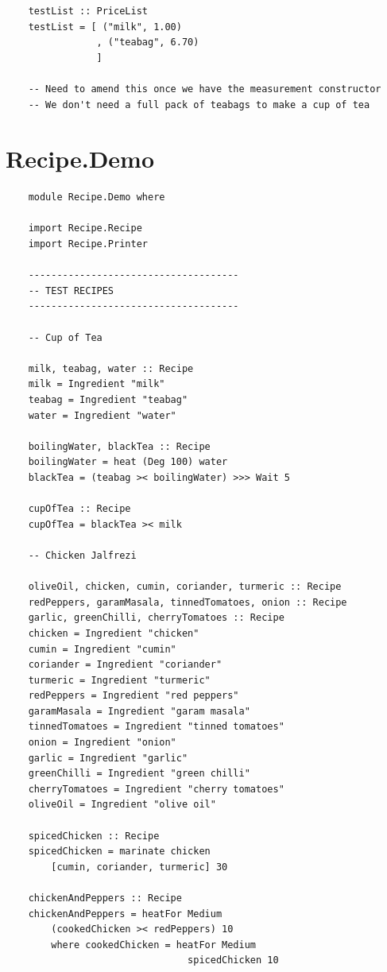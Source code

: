 \documentclass[11pt]{article}
\begin{document}
\begin{tt}
\begin{lstlisting}
    testList :: PriceList
    testList = [ ("milk", 1.00)
                , ("teabag", 6.70)
                ]
    
    -- Need to amend this once we have the measurement constructor
    -- We don't need a full pack of teabags to make a cup of tea
    \end{lstlisting}
    \end{tt}

    \section{Recipe.Demo}

    \begin{tt}
    \small
    \begin{lstlisting}
    module Recipe.Demo where
    
    import Recipe.Recipe
    import Recipe.Printer
    
    -------------------------------------
    -- TEST RECIPES
    -------------------------------------
    
    -- Cup of Tea
    
    milk, teabag, water :: Recipe
    milk = Ingredient "milk"
    teabag = Ingredient "teabag"
    water = Ingredient "water"
    
    boilingWater, blackTea :: Recipe
    boilingWater = heat (Deg 100) water
    blackTea = (teabag >< boilingWater) >>> Wait 5

    cupOfTea :: Recipe
    cupOfTea = blackTea >< milk
    
    -- Chicken Jalfrezi
    
    oliveOil, chicken, cumin, coriander, turmeric :: Recipe
    redPeppers, garamMasala, tinnedTomatoes, onion :: Recipe
    garlic, greenChilli, cherryTomatoes :: Recipe
    chicken = Ingredient "chicken"
    cumin = Ingredient "cumin"
    coriander = Ingredient "coriander"
    turmeric = Ingredient "turmeric"
    redPeppers = Ingredient "red peppers"
    garamMasala = Ingredient "garam masala"
    tinnedTomatoes = Ingredient "tinned tomatoes"
    onion = Ingredient "onion"
    garlic = Ingredient "garlic"
    greenChilli = Ingredient "green chilli"
    cherryTomatoes = Ingredient "cherry tomatoes"
    oliveOil = Ingredient "olive oil"
    
    spicedChicken :: Recipe
    spicedChicken = marinate chicken
        [cumin, coriander, turmeric] 30
    
    chickenAndPeppers :: Recipe
    chickenAndPeppers = heatFor Medium
        (cookedChicken >< redPeppers) 10
        where cookedChicken = heatFor Medium
                                spicedChicken 10
    

\end{lstlisting}
\end{tt}
\end{document}
